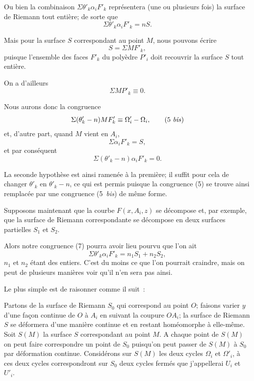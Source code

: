 \documentclass{article}
\begin{document}
Ou bien la combinaison $\Sigma \theta'_{k} \alpha_{i}F'_{k}$ représentera (une ou plusieurs fois) la surface de Riemann tout entière; de sorte que
\[ \Sigma \theta'_{k} \alpha_{i}F'_{k} = nS. \]

Mais pour la surface $S$ correspondant au point $M$, nous pouvons écrire
\[ S = \Sigma MF'_{k}, \]
puisque l'ensemble des faces $F'_{k}$ du polyèdre $P'_{i}$ doit recouvrir la surface $S$ tout entière.

On a d'ailleurs
\[ \Sigma MP'_{k} \equiv 0. \]


Nous aurons donc la congruence
\[ \Sigma (\theta'_{k} - n) MF'_{k} \equiv \Omega'_{i} - \Omega_{i}, \tag{5 \textit{bis}} \]
et, d'autre part, quand $M$ vient en $A_{i}$,
\[ \Sigma \alpha_{i}F'_{k} = S, \]
et par conséquent
\[ \Sigma (\theta'_{k} - n) \alpha_{i}F'_{k} = 0. \]

La seconde hypothèse est ainsi ramenée à la première; il suffit pour cela de changer $\theta'_{k}$ en $\theta'_{k} - n$, ce qui est permis puisque la congruence (5) se trouve ainsi remplacée par une congruence (5~\emph{bis}) de même forme.

Supposons maintenant que la courbe $F(x, A_{i}, z)$ se décompose et, par exemple, que la surface de Riemann correspondante se décompose en deux surfaces partielles $S_{1}$ et $S_{2}$.

Alors notre congruence (7) pourra avoir lieu pourvu que l'on ait
\[ \Sigma \theta'_{k} \alpha_{i}F'_{k} = n_{1}S_{1} + n_{2}S_{2}, \]
$n_{1}$ et $n_{2}$ étant des entiers. C'est du moins ce que l'on pourrait craindre, mais on peut de plusieurs manières voir qu'il n'en sera pas ainsi.

Le plus simple est de raisonner comme il suit~:

Partons de la surface de Riemann $S_{0}$ qui correspond au point $O$; faisons varier $y$ d'une façon continue de $O$ à $A_{i}$ en suivant la coupure $OA_{i}$; la surface de Riemann $S$ se déformera d'une manière continue et en restant homéomorphe à elle-même. Soit $S(M)$ la surface $S$ correspondant au point $M$. A chaque point de $S(M)$ on peut faire correspondre un point de $S_{0}$ puisqu'on peut passer de $S(M)$ à $S_{0}$ par déformation continue. Considérons sur $S(M)$ les deux cycles $\Omega_{i}$ et $\Omega'_{i}$, à ces deux cycles correspondront sur $S_{0}$ deux cycles fermés que j'appellerai $U_{i}$ et $U'_{i}$.
\end{document}
